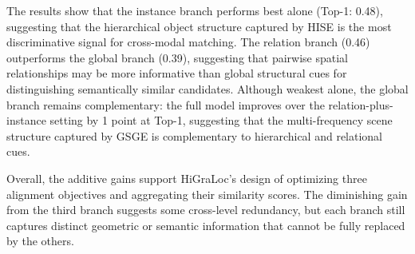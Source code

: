 \documentclass{article}
\begin{document}
The results show that the instance branch performs best alone (Top-1: 0.48), suggesting that the hierarchical object structure captured by HISE is the most discriminative signal for cross-modal matching. The relation branch (0.46) outperforms the global branch (0.39), suggesting that pairwise spatial relationships may be more informative than global structural cues for distinguishing semantically similar candidates. Although weakest alone, the global branch remains complementary: the full model improves over the relation-plus-instance setting by 1 point at Top-1, suggesting that the multi-frequency scene structure captured by GSGE is complementary to hierarchical and relational cues.

Overall, the additive gains support HiGraLoc's design of optimizing three alignment objectives and aggregating their similarity scores. The diminishing gain from the third branch suggests some cross-level redundancy, but each branch still captures distinct geometric or semantic information that cannot be fully replaced by the others.
\end{document}
